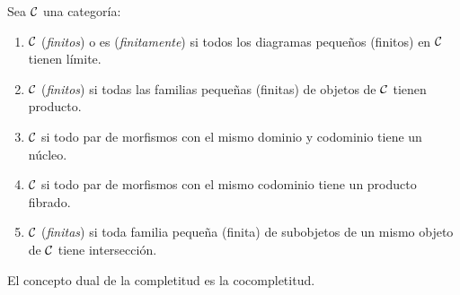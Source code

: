 \begin{definition}
  Sea $\mathcal{C}$ una categoría:
  \begin{enumerate}
  \item $\mathcal{C}$  (\emph{finitos}) o es (\emph{finitamente})
     si todos los diagramas pequeños (finitos) en $\mathcal{C}$ tienen
    límite.
  \item $\mathcal{C}$  (\emph{finitos}) si todas las familias
    pequeñas (finitas) de objetos de $\mathcal{C}$ tienen producto.
  \item $\mathcal{C}$  si todo par de morfismos con el mismo dominio
    y codominio tiene un núcleo.
  \item $\mathcal{C}$  si todo par de morfismos con el
    mismo codominio tiene un producto fibrado.
  \item $\mathcal{C}$  (\emph{finitas}) si toda familia
    pequeña (finita) de subobjetos de un mismo objeto de $\mathcal{C}$ tiene intersección.
  \end{enumerate}
\end{definition}

El concepto dual de la completitud es la cocompletitud.

